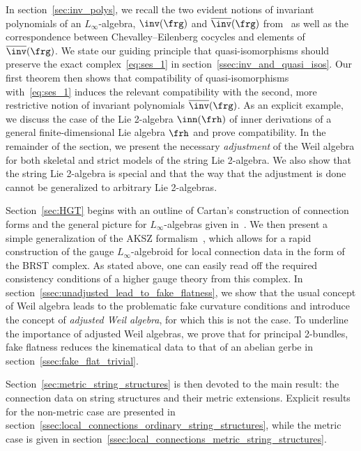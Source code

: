\documentclass[reqno,a4paper,11pt]{article}
\begin{document}
In section~\ref{sec:inv_polys}, we recall the two evident notions of invariant polynomials of an $L_\infty$-algebra, $\inv(\frg)$ and $\overline{\inv}(\frg)$ from~\cite{Sati:2008eg} as well as the correspondence between Chevalley--Eilenberg cocycles and elements of $\overline{\inv}(\frg)$. We state our guiding principle that quasi-isomorphisms should preserve the exact complex~\eqref{eq:ses_1} in section~\ref{ssec:inv_and_quasi_isos}. Our first theorem then shows that compatibility of quasi-isomorphisms with~\eqref{eq:ses_1} induces the relevant compatibility with the second, more restrictive notion of invariant polynomials $\overline{\inv}(\frg)$. As an explicit example, we discuss the case of the Lie 2-algebra $\inn(\frh)$ of inner derivations of a general finite-dimensional Lie algebra $\frh$ and prove compatibility. In the remainder of the section, we present the necessary {\em adjustment} of the Weil algebra for both skeletal and strict models of the string Lie 2-algebra. We also show that the string Lie 2-algebra is special and that the way that the adjustment is done cannot be generalized to arbitrary Lie 2-algebras.

Section~\ref{sec:HGT} begins with an outline of Cartan's construction of connection forms and the general picture for $L_\infty$-algebras given in~\cite{Sati:2008eg}. We then present a simple generalization of the AKSZ formalism~\cite{Alexandrov:1995kv}, which allows for a rapid construction of the gauge $L_\infty$-algebroid for local connection data in the form of the BRST complex. As stated above, one can easily read off the required consistency conditions of a higher gauge theory from this complex. In section~\ref{ssec:unadjusted_lead_to_fake_flatness}, we show that the usual concept of Weil algebra leads to the problematic fake curvature conditions and introduce the concept of {\em adjusted Weil algebra}, for which this is not the case. To underline the importance of adjusted Weil algebras, we prove that for principal 2-bundles, fake flatness reduces the kinematical data to that of an abelian gerbe in section~\ref{ssec:fake_flat_trivial}.

Section~\ref{sec:metric_string_structures} is then devoted to the main result: the connection data on string structures and their metric extensions. Explicit results for the non-metric case are presented in section~\ref{ssec:local_connections_ordinary_string_structures}, while the metric case is given in section~\ref{ssec:local_connections_metric_string_structures}.
\end{document}
